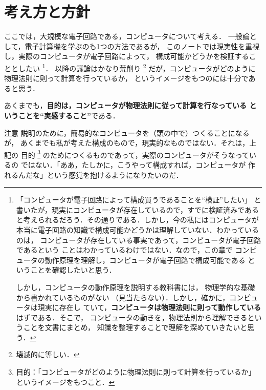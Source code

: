 ﻿%

    \section{考え方と方針}
    ここでは，大規模な電子回路である，コンピュータについて考える．
    一般論として，電子計算機を学ぶのも1つの方法であるが，
    このノートでは現実性を重視し，実際のコンピュータが電子回路によって，
    構成可能かどうかを検証することとしたい
        \footnote{
            「コンピュータが電子回路によって構成買うであることを“検証”したい」
            と書いたが，現実にコンピュータが存在しているので，すでに検証済みである
            と考えられるだろう．その通りである．しかし，今の私にはコンピュータが
            本当に電子回路の知識で構成可能かどうかは理解していない．わかっているのは，
            コンピュータが存在している事実であって，コンピュータが電子回路であるという
            ことはわかっているわけではない．なので，この章で
            コンピュータの動作原理を理解し，コンピュータが電子回路で構成可能である
            ということを確認したいと思う．

            しかし，コンピュータの動作原理を説明する教科書には，
            物理学的な基礎から書かれているものがない
            （見当たらない）．しかし，確かに，コンピュータは現実に存在し
            ていて，\textbf{コンピュータは物理法則に則って動作している}はずである．そこで，
            コンピュータの動きを，物理法則から理解できるということを文書にまとめ，
            知識を整理することで理解を深めていきたいと思う．
         }．
    以降の議論はかなり荒削り
        \footnote{
            壊滅的に等しい．
        }
    だが，コンピュータがどのように物理法則に則って計算を行っているか，
    というイメージをもつのには十分であると思う．

    あくまでも，\textbf{目的は，コンピュータが物理法則に従って計算を行なっている
    ということを“実感すること”}である．

    \begin{memo}{注意}
        説明のために，簡易的なコンピュータを（頭の中で）つくることになるが，
        あくまでも私が考えた構成のもので，現実的なものではない．それは，上記の
        目的
            \footnote{
                目的：「コンピュータがどのように物理法則に則って計算を行っているか」
                というイメージをもつこと．
            }
        のためにつくるものであって，実際のコンピュータがそうなっているの
        ではない．「ああ，たしかに，こうやって構成すれば，コンピュータが
        作れるんだな」という感覚を抱けるようになりたいのだ．
    \end{memo}


